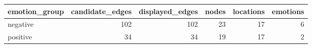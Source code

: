 \begin{tabular}{lrrrrr}
\toprule
emotion\_group & candidate\_edges & displayed\_edges & nodes & locations & emotions \\
\midrule
negative & 102 & 102 & 23 & 17 & 6 \\
positive & 34 & 34 & 19 & 17 & 2 \\
\bottomrule
\end{tabular}

